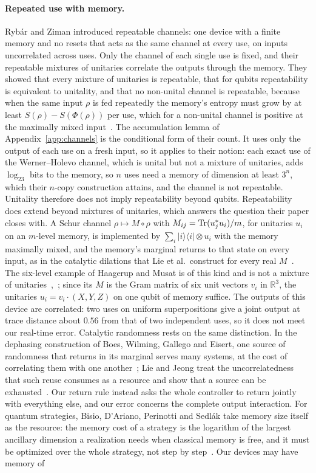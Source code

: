 \paragraph{Repeated use with memory.} Ryb\'ar and Ziman introduced repeatable channels: one device with a finite memory and no resets that acts as the same channel at every use, on inputs uncorrelated across uses. Only the channel of each single use is fixed, and their repeatable mixtures of unitaries correlate the outputs through the memory. They showed that every mixture of unitaries is repeatable, that for qubits repeatability is equivalent to unitality, and that no non-unital channel is repeatable, because when the same input $\rho$ is fed repeatedly the memory's entropy must grow by at least $S(\rho)-S(\Phi(\rho))$ per use, which for a non-unital channel is positive at the maximally mixed input~\cite{RybarZiman}. The accumulation lemma of Appendix~\ref{app:channels} is the conditional form of their count. It uses only the output of each use on a fresh input, so it applies to their notion: each exact use of the Werner--Holevo channel, which is unital but not a mixture of unitaries, adds $\log_23$ bits to the memory, so $n$ uses need a memory of dimension at least $3^n$, which their $n$-copy construction attains, and the channel is not repeatable. Unitality therefore does not imply repeatability beyond qubits. Repeatability does extend beyond mixtures of unitaries, which answers the question their paper closes with. A Schur channel $\rho\mapsto M\circ\rho$ with $M_{ij}=\operatorname{Tr}(u_j^*u_i)/m$, for unitaries $u_i$ on an $m$-level memory, is implemented by $\sum_i|i\rangle\langle i|\otimes u_i$ with the memory maximally mixed, and the memory's marginal returns to that state on every input, as in the catalytic dilations that Lie et al.\ construct for every real $M$~\cite[Prop.~15]{LieEtAl26}. The six-level example of Haagerup and Musat is of this kind and is not a mixture of unitaries~\cite[Ex.~3.3]{HaagerupMusat11},~\cite[App.~C.2]{LieEtAl26}; since its $M$ is the Gram matrix of six unit vectors $v_i$ in $\mathbb R^3$, the unitaries $u_i=v_i\cdot(X,Y,Z)$ on one qubit of memory suffice. The outputs of this device are correlated: two uses on uniform superpositions give a joint output at trace distance about $0.56$ from that of two independent uses, so it does not meet our real-time error. Catalytic randomness rests on the same distinction. In the dephasing construction of Boes, Wilming, Gallego and Eisert, one source of randomness that returns in its marginal serves many systems, at the cost of correlating them with one another~\cite{Boes18,Boes18err}; Lie and Jeong treat the uncorrelatedness that such reuse consumes as a resource and show that a source can be exhausted~\cite{LieJeong21}. Our return rule instead asks the whole controller to return jointly with everything else, and our error concerns the complete output interaction. For quantum strategies, Bisio, D'Ariano, Perinotti and Sedl\'ak take memory size itself as the resource: the memory cost of a strategy is the logarithm of the largest ancillary dimension a realization needs when classical memory is free, and it must be optimized over the whole strategy, not step by step~\cite{Bisio12}. Our devices may have memory of 